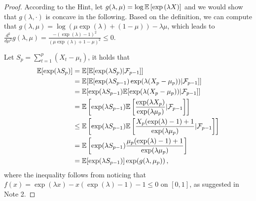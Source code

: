 \begin{proof}

    According to the Hint, let $g(\lambda, \mu) = \log \mathbb{E} \left[\exp\left(\lambda X\right)\right]$ and we would show that $g(\lambda, \cdot)$ is concave in the following.
    Based on the definition, we can compute that $g(\lambda, \mu) = \log(\mu \exp(\lambda) + (1 - \mu)) - \lambda \mu$,
    which leads to $\frac{d^2}{d \mu^2} g(\lambda, \mu) = \frac{-(\exp(\lambda) - 1)^2}{(\mu \exp(\lambda) + 1 - \mu)^2} \leq 0$.

    Let $S_p = \sum_{t=1}^p (X_t - \mu_t)$, it holds that
    \begin{equation*}
        \begin{aligned}
            \mathbb{E}[\exp(\lambda S_p)]
            &= \mathbb{E}[\mathbb{E}[\exp(\lambda S_p) | \mathcal{F}_{p-1}]]\\
            &= \mathbb{E}[\mathbb{E}[\exp(\lambda S_{p-1}) \exp(\lambda(X_p - \mu_p)) | \mathcal{F}_{p-1}]]\\
            &= \mathbb{E}[\exp(\lambda S_{p-1}) \mathbb{E}[\exp(\lambda(X_p - \mu_p)) | \mathcal{F}_{p-1}]]\\
            &= \mathbb{E} \left[\exp(\lambda S_{p-1}) \mathbb{E} \left[ \frac{\exp(\lambda X_p)}{\exp(\lambda \mu_p)} | \mathcal{F}_{p-1} \right]\right]\\
            &\leq \mathbb{E} \left[\exp(\lambda S_{p-1}) \mathbb{E} \left[\frac{X_p (\exp(\lambda) - 1) + 1}{\exp(\lambda \mu_p)} | \mathcal{F}_{p-1}\right]\right]\\
            &= \mathbb{E} \left[\exp(\lambda S_{p-1}) \frac{\mu_p(\exp(\lambda) - 1) + 1}{\exp(\lambda \mu_p)}\right]\\
            &= \mathbb{E}[\exp(\lambda S_{p-1})] \exp(g(\lambda, \mu_p))\,,
        \end{aligned}
    \end{equation*}
    where the inequality follows from noticing that $f(x) = \exp(\lambda x) - x(\exp(\lambda) - 1) - 1 \leq 0$ on $[0, 1]$, as suggested in Note 2. 


\end{proof}
